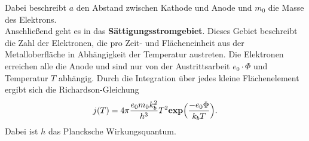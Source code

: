 Dabei beschreibt $a$ den Abstand zwischen Kathode und Anode und $m_0$ die Masse des Elektrons.\\
Anschließend geht es in das \textbf{Sättigungsstromgebiet}. Dieses Gebiet beschreibt die Zahl der Elektronen, die pro
Zeit- und Flächeneinheit aus der Metalloberfläche in Abhängigkeit der Temperatur austreten.
Die Elektronen erreichen alle die Anode und sind nur von der Austrittsarbeit $e_0 \cdot \Phi$ und Temperatur $T$
abhängig.
Durch die Integration über jedes kleine Flächenelement ergibt sich die Richardson-Gleichung
\begin{equation}
  j(T) = 4 \pi \frac{e_0 m_0 k_b^2}{h^3} T^2 \textbf{exp}\Bigl(\frac{-e_0 \Phi}{k_bT}\Bigr).
  \label{eq:3}
\end{equation}
Dabei ist $h$ das Plancksche Wirkungsquantum.
